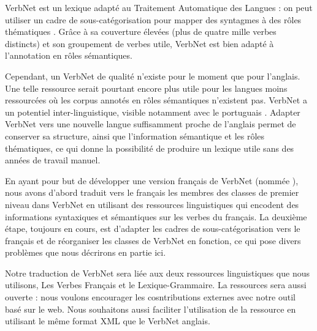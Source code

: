 VerbNet est un lexique adapté au Traitement Automatique des Langues : on peut
utiliser un cadre de sous-catégorisation pour mapper des syntagmes à des rôles
thématiques \citep{swier2005exploiting,pradet2013revisiting}. Grâce à sa
couverture élevées (plus de quatre mille verbes distincts) et son groupement de
verbes utile, VerbNet est bien adapté à l'annotation en rôles sémantiques.

Cependant, un VerbNet de qualité n'existe pour le moment que pour l'anglais.
Une telle ressource serait pourtant encore plus utile pour les langues moins
ressourcées où les corpus annotés en rôles sémantiques n'existent pas. VerbNet
a un potentiel inter-linguistique, visible notamment avec le portuguais
\citep[section 2.2.2]{kipperschuler2005verbnet}. Adapter VerbNet vers une
nouvelle langue suffisamment proche de l'anglais permet de conserver sa
structure, ainsi que l'information sémantique et les rôles thématiques, ce qui
donne la possibilité de produire un lexique utile sans des années de travail
manuel.


En ayant pour but de développer une version français de VerbNet (nommée
\verbenet{}), nous avons d'abord traduit vers le français les membres des
classes de premier niveau dans VerbNet en utilisant des ressources
linguistiques qui encodent des informations syntaxiques et sémantiques sur les
verbes du français. La deuxième étape, toujours en cours, est d'adapter les
cadres de sous-catégorisation vers le français et de réorganiser les classes de
VerbNet en fonction, ce qui pose divers problèmes que nous décrirons en partie
ici.

Notre traduction de VerbNet sera liée aux deux ressources linguistiques que
nous utilisons, Les Verbes Français et le Lexique-Grammaire. La ressources sera
aussi ouverte : nous voulons encourager les cosntributions externes avec notre
outil basé sur le web. Nous souhaitons aussi faciliter l'utilisation de la
ressource en utilisant le même format XML que le VerbNet anglais.

